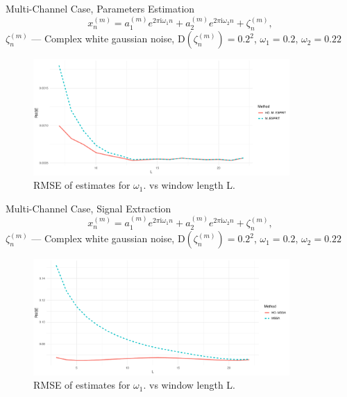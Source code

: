 \documentclass[pdf, unicode, ucs, notheorems]{beamer}
\theoremstyle{definition}
\begin{document}
\begin{frame}{Multi-Channel Case, Parameters Estimation}
  \vspace*{-0.3cm}
  \[
    x_{n}^{(m)} = a_1^{(m)}
    e^{2 \pi \mathrm{i} \omega_1 n} +
    a_2^{(m)}
    e^{2 \pi \mathrm{i} \omega_2 n} + \zeta_n^{(m)},
  \]
  $\zeta_n^{(m)}$ --- Complex white gaussian noise,
  $\mathrm{D}\left(\zeta_n^{(m)}\right) = 0.2^2$, $\omega_1 = 0.2,\,
  \omega_2 = 0.22$
  \begin{figure}[!ht]
    \centering
    \includegraphics[width=0.87\textwidth]{img/freq1_L_no_rates.pdf}
    \caption{RMSE of estimates for $\omega_1$. vs window length L.}
  \end{figure}
\end{frame}

\begin{frame}{Multi-Channel Case, Signal Extraction}
  \vspace*{-0.3cm}
  \[
    x_{n}^{(m)} = a_1^{(m)}
    e^{2 \pi \mathrm{i} \omega_1 n} +
    a_2^{(m)}
    e^{2 \pi \mathrm{i} \omega_2 n} + \zeta_n^{(m)},
  \]
  $\zeta_n^{(m)}$ --- Complex white gaussian noise,
  $\mathrm{D}\left(\zeta_n^{(m)}\right) = 0.2^2$, $\omega_1 = 0.2,\,
  \omega_2 = 0.22$
  \begin{figure}[!ht]
    \centering
    \includegraphics[width=0.87\textwidth]{img/rec_L_rmse_no_rates.pdf}
    \caption{RMSE of estimates for $\omega_1$. vs window length L.}
  \end{figure}
\end{frame}
\end{document}
